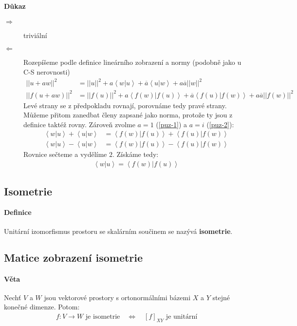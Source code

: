 \documentclass[a4paper,10pt]{article}
\begin{document}
\paragraph{Důkaz}
\begin{description}
	\item[$\Rightarrow$] triviální
	\item[$\Leftarrow$] Rozepíšeme podle definice lineárního zobrazení a normy
	(podobně jako u C-S nerovnosti)
		\begin{align}
			||u+aw||^2      &=  ||u||^2 + a \left< w | u\right> +
				\overline{a} \left<u | w \right> + a \overline{a} 	||w||^2 \\
			||f(u + aw)||^2 &= 	||f(u)||^2 + a \left< f(w) | f(u)\right> +
				\overline{a} \left< f(u) | f(w) \right> + a \overline{a} ||f(w)||^2
		\end{align}
		Levé strany se z předpokladu rovnají, porovnáme tedy pravé strany.
		Můžeme přitom zanedbat členy zapsané jako norma, protože ty jsou z
		definice taktéž rovny.
		Zároveň zvolme $a = 1$ (\ref{puz-1}) a $a = i$ (\ref{puz-2}):
		\begin{align}
			\label{puz-1} 
				\left< w | u \right> + \left< u | w \right> &= \left<
				f(w)|f(u)\right> + \left< f(u)|f(w)\right> \\
			\label{puz-2}
				\left< w | u \right> - \left< u | w \right> &= \left<
				f(w)|f(u)\right> - \left< f(u)|f(w)\right>
		\end{align}
		Rovnice sečteme a vydělíme $2$. Získáme tedy:
		\begin{align}
			\left< w | u \right> = \left< f(w) | f(u) \right>
		\end{align}
\end{description}


\subsection{Isometrie}
\setcounter{equation}{0}
\paragraph{Definice}
Unitární izomorfismus prostoru se skalárním součinem se nazývá \textbf{isometrie}.


\subsection{Matice zobrazení isometrie}
\setcounter{equation}{0}
\paragraph{Věta}
Nechť $V$ a $W$ jsou vektorové prostory s ortonormálními bázemi $X$ a $Y$ stejné konečné
dimenze. Potom:
\begin{align*}
	f: V \to W \text{ je isometrie} \quad \Leftrightarrow \quad [f]_{XY} \text{ je
	unitární}
\end{align*}
\end{document}
